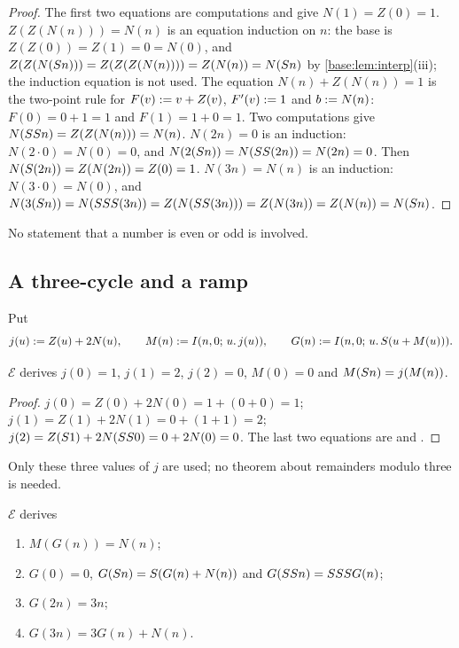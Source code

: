 \begin{proof}
The first two equations are computations and give $N(1)=Z(0)=1$.
$Z(Z(N(n)))=N(n)$ is an equation induction on $n$: the base is
$Z(Z(0))=Z(1)=0=N(0)$, and
$Z(Z(N(S n)))=Z(Z(Z(N(n))))=Z(N(n))=N(S n)$ by
\cref{base:lem:interp}(iii); the induction equation is not used.  The
equation $N(n)+Z(N(n))=1$ is the two-point rule for $F(v)\mathrel{:=} v+Z(v)$,
$F'(v)\mathrel{:=} 1$ and $b\mathrel{:=} N(n)$: $F(0)=0+1=1$ and $F(1)=1+0=1$.  Two
computations give $N(SS n)=Z(Z(N(n)))=N(n)$.  $N(2n)=0$ is an
induction: $N(2\cdot 0)=N(0)=0$, and
$N(2(S n))=N(SS(2n))=N(2n)=0$.  Then
$N(S(2n))=Z(N(2n))=Z(0)=1$.  $N(3n)=N(n)$ is an induction:
$N(3\cdot 0)=N(0)$, and
$N(3(S n))=N(SSS(3n))=Z(N(SS(3n)))=Z(N(3n))=Z(N(n))
=N(S n)$.
\end{proof}

No statement that a number is even or odd is involved.

\subsection{A three-cycle and a ramp}

Put
\[
 j(u)\mathrel{:=} Z(u)+2N(u),\qquad M(n)\mathrel{:=}I(n,0;\,u.\,j(u)),\qquad
 G(n)\mathrel{:=}I(n,0;\,u.\,S(u+M(u))) .
\]

\begin{lemma}
\label{base:lem:cycle}
$\mathcal E$ derives $j(0)=1$, $j(1)=2$, $j(2)=0$, $M(0)=0$ and
$M(S n)=j(M(n))$.
\end{lemma}

\begin{proof}
$j(0)=Z(0)+2N(0)=1+(0+0)=1$; $j(1)=Z(1)+2N(1)=0+(1+1)=2$;
$j(2)=Z(S 1)+2N(SS 0)=0+2N(0)=0$.  The last two equations are
 and .
\end{proof}

Only these three values of $j$ are used; no theorem about remainders modulo
three is needed.

\begin{lemma}[Ramp]
\label{base:lem:ramp}
$\mathcal E$ derives
\begin{enumerate}[label=\textup{(\roman*)}]
\item $M(G(n))=N(n)$;
\item $G(0)=0$, $G(S n)=S(G(n)+N(n))$ and
 $G(SS n)=SSS G(n)$;
\item $G(2n)=3n$;
\item $G(3n)=3G(n)+N(n)$.
\end{enumerate}
\end{lemma}

